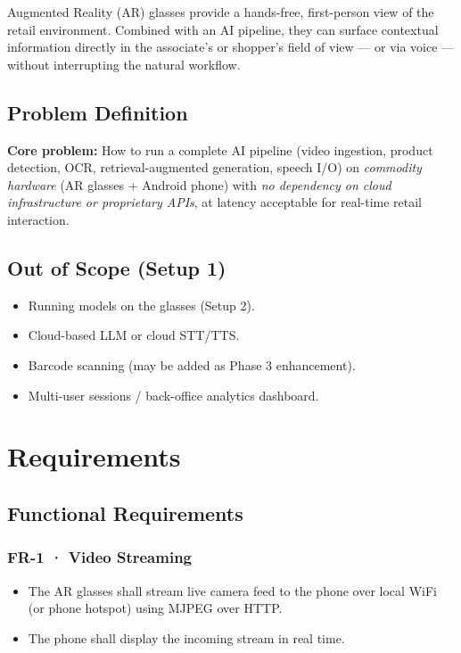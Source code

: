 \documentclass[11pt,a4paper]{article}
\begin{document}
Augmented Reality (AR) glasses provide a hands-free, first-person view of the
retail environment. Combined with an AI pipeline, they can surface contextual
information directly in the associate's or shopper's field of view --- or via
voice --- without interrupting the natural workflow.

\subsection{Problem Definition}

\begin{infobox}
\textbf{Core problem:} How to run a complete AI pipeline (video ingestion,
product detection, OCR, retrieval-augmented generation, speech I/O) on
\emph{commodity hardware} (AR glasses + Android phone) with \emph{no dependency
on cloud infrastructure or proprietary APIs}, at latency acceptable for
real-time retail interaction.
\end{infobox}

\subsection{Out of Scope (Setup 1)}

\begin{itemize}[noitemsep]
  \item Running models on the glasses (Setup 2).
  \item Cloud-based LLM or cloud STT/TTS.
  \item Barcode scanning (may be added as Phase 3 enhancement).
  \item Multi-user sessions / back-office analytics dashboard.
\end{itemize}

\section{Requirements}

\subsection{Functional Requirements}

\subsubsection{FR-1 · Video Streaming}
\begin{itemize}[noitemsep]
  \item The AR glasses shall stream live camera feed to the phone over local
        WiFi (or phone hotspot) using MJPEG over HTTP.
  \item The phone shall display the incoming stream in real time.
\end{itemize}
\end{document}
